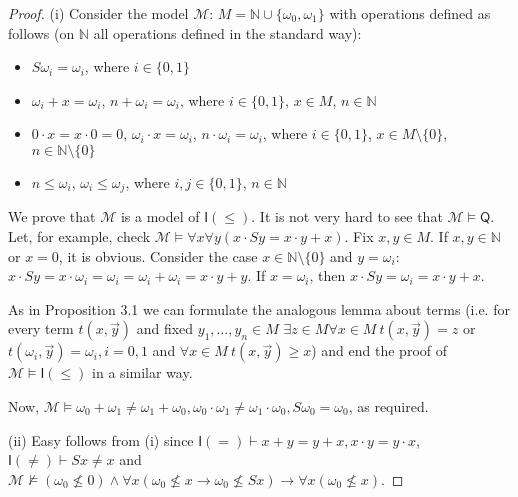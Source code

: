 \documentclass[a4paper,14pt]{article}
\theoremstyle{definition}
\theoremstyle{theorem}
\theoremstyle{lemma}
\theoremstyle{proposition}
\theoremstyle{remark}
\theoremstyle{corollary}
\theoremstyle{problem}
\theoremstyle{hypothesis}
\begin{document}
\begin{proof}
    (i) Consider the model $\mathcal M$: $M = \mathbb N \cup \{\omega_0, \omega_1\}$ with operations defined as follows (on $\mathbb N$ all operations defined in the standard way):
    \begin{itemize}
        \item $S \omega_i = \omega_i$, where $i \in \{0, 1\}$
        \item $\omega_i + x = \omega_i$, $n + \omega_i = \omega_i$, where $i \in \{0, 1\}$, $x \in M$, $n \in \mathbb N$
        \item $0 \cdot x = x \cdot 0 = 0$, $\omega_i \cdot x = \omega_i$, $n \cdot \omega_i = \omega_i$, where $i \in \{0, 1\}$, $x \in M \setminus \{0\}$, $n \in \mathbb N \setminus \{0\}$
        \item $n \leqslant \omega_i$, $\omega_i \leqslant \omega_j$, where $i, j \in \{0, 1\}$, $n \in \mathbb N$
    \end{itemize}
    
    We prove that $\mathcal M$ is a model of $\mathsf{I(\leqslant)}$. It is not very hard to see that $\mathcal M \vDash \mathsf Q$. Let, for example, check $\mathcal M \vDash \forall x \forall y (x \cdot S y = x \cdot y + x)$. Fix $x, y \in M$. If $x, y \in \mathbb N$ or $x = 0$, it is obvious. Consider the case $x \in \mathbb N \setminus \{0\}$ and $y = \omega_i$: $x \cdot S y = x \cdot \omega_i = \omega_i = \omega_i + \omega_i = x \cdot y + y$. If $x = \omega_i$, then $x \cdot S y = \omega_i = x \cdot y + x$. 
    
    As in Proposition 3.1 we can formulate the analogous lemma about terms (i.e. for every term $t(x, \vec y)$ and fixed $y_1, \dots, y_n \in M$  $\exists z \in M \forall x \in M \: t(x, \vec y) = z$ or $t(\omega_i, \vec y) = \omega_i, i = 0, 1$ and $\forall x \in M \: t(x, \vec y) \geqslant x$) and end the proof of $\mathcal M \vDash \mathsf{I(\leqslant)}$ in a similar way.
    
    
    
    Now, $\mathcal M \vDash \omega_0 + \omega_1 \ne \omega_1 + \omega_0, \omega_0 \cdot \omega_1 \ne \omega_1 \cdot \omega_0, S \omega_0 = \omega_0$, as required.
    
    (ii) Easy follows from (i) since $\mathsf I(=) \vdash x + y = y + x, x \cdot y = y \cdot x$, $\mathsf I (\ne) \vdash S x \ne x$ and $\mathcal M \nvDash (\omega_0 \nleqslant 0) \wedge \forall x (\omega_0 \nleqslant x \rightarrow \omega_0 \nleqslant Sx) \rightarrow \forall x (\omega_0 \nleqslant x)$.
\end{proof}
\end{document}
